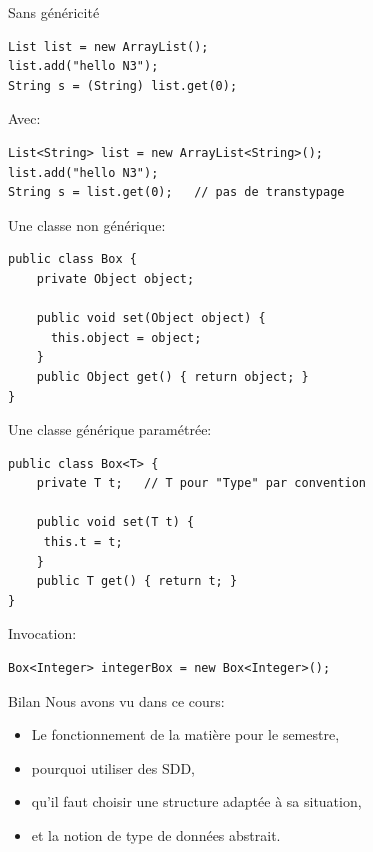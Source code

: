 \documentclass[12pt,a4paper,handout]{beamer}
\begin{document}
\begin{frame}[fragile]

Sans généricité
\begin{lstlisting}
List list = new ArrayList();
list.add("hello N3");
String s = (String) list.get(0);
\end{lstlisting}
\pause

Avec:
\begin{lstlisting}
List<String> list = new ArrayList<String>();
list.add("hello N3");
String s = list.get(0);   // pas de transtypage
\end{lstlisting}

\end{frame}


\begin{frame}[fragile]
Une classe non générique:
\begin{lstlisting}
public class Box {
    private Object object;

    public void set(Object object) { 
      this.object = object; 
    }
    public Object get() { return object; }
}
\end{lstlisting}

\end{frame}

\begin{frame}[fragile]
Une classe générique paramétrée:
\begin{lstlisting}
public class Box<T> {
    private T t;   // T pour "Type" par convention

    public void set(T t) {
     this.t = t; 
    }
    public T get() { return t; }
}
\end{lstlisting}
\pause
Invocation:
\begin{lstlisting}
Box<Integer> integerBox = new Box<Integer>();
\end{lstlisting}

\end{frame}

\begin{frame}{Bilan}
Nous avons vu dans ce cours:
\begin{itemize}
\item Le fonctionnement de la matière pour le semestre,
\item pourquoi utiliser des SDD,
\item qu'il faut choisir une structure adaptée à sa situation,
\item et la notion de type de données abstrait.
\end{itemize}
\end{frame}
\end{document}
